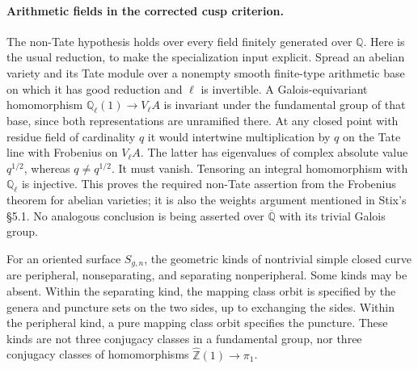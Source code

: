 \paragraph{Arithmetic fields in the corrected cusp criterion.}
The non-Tate hypothesis holds over every field finitely generated over
$\mathbb Q$. Here is the usual reduction, to make the specialization
input explicit. Spread an abelian variety and its Tate module over a
nonempty smooth finite-type arithmetic base on which it has good
reduction and $\ell$ is invertible. A Galois-equivariant homomorphism
$\mathbb Q_\ell(1)\to V_\ell A$ is invariant under the fundamental
group of that base, since both representations are unramified there.
At any closed point with residue field of cardinality $q$ it would
intertwine multiplication by $q$ on the Tate line with Frobenius on
$V_\ell A$. The latter has eigenvalues of complex absolute value
$q^{1/2}$, whereas $q\ne q^{1/2}$. It must vanish. Tensoring an
integral homomorphism with $\mathbb Q_\ell$ is injective. This proves
the required non-Tate assertion from the Frobenius theorem for
abelian varieties; it is also the weights argument mentioned in
Stix's \S5.1. No analogous conclusion is being asserted over
$\overline{\mathbb Q}$ with its trivial Galois group.

\begin{proposition}
\label{A:three-types}
For an oriented surface $S_{g,n}$, the geometric kinds of nontrivial
simple closed curve are peripheral, nonseparating, and separating
nonperipheral. Some kinds may be absent. Within the separating kind,
the mapping class orbit is specified by the genera and puncture sets
on the two sides, up to exchanging the sides. Within the peripheral
kind, a pure mapping class orbit specifies the puncture. These kinds
are not three conjugacy classes in a fundamental group, nor three
conjugacy classes of homomorphisms
$\widehat{\mathbb Z}(1)\to\pi_1$.
\end{proposition}

